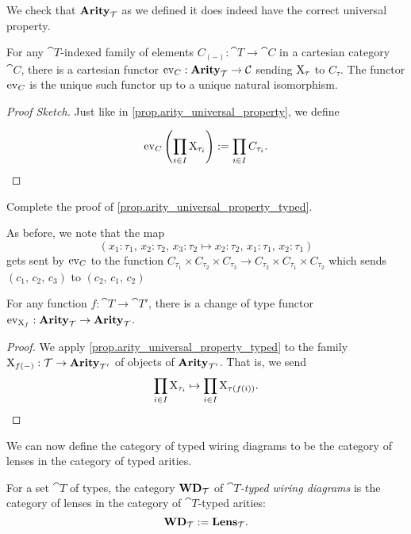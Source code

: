 \documentclass[DynamicalBook]{subfiles}
\begin{document}
We check that $\textbf{Arity}_{\mathcal{T}}$ as we defined it does indeed have the correct
universal property.
\begin{proposition}\label{prop.arity_universal_property_typed}
  For any $\cat{T}$-indexed family of elements $C_{(-)} : \cat{T} \to \cat{C}$
  in a cartesian category $\cat{C}$, there is a cartesian functor $\mathrm{ev}_C :
  \textbf{Arity}_{\mathcal{T}} \to \mathcal{C}$ sending $\mathrm{X}_{\tau}$ to $C_{\tau}$. The functor
  $\mathrm{ev}_C$ is the unique such functor up to a unique natural isomorphism.
\end{proposition}
\begin{proof}[Proof Sketch]
  Just like in \cref{prop.arity_universal_property}, we define

  $$\mathrm{ev}_C\left( \prod_{i \in I} \mathrm{X}_{\tau_i} \right) :=
  \prod_{i \in I} C_{\tau_i}.\qedhere$$
\end{proof}
\begin{exercise}
  Complete the proof of \cref{prop.arity_universal_property_typed}.
\end{exercise}

As before, we note that the map
$$(x_1 : \tau_1,\, x_2 : \tau_2,\, x_3 : \tau_2 \mapsto x_2 : \tau_2,\, x_1 :
\tau_1,\, x_2 : \tau_1)$$
gets sent by $\mathrm{ev}_C$ to the function $C_{\tau_1} \times C_{\tau_2} \times C_{\tau_3} \to
C_{\tau_2} \times C_{\tau_1} \times C_{\tau_2}$ which sends $(c_1,\, c_2,\, c_3)$ to
$(c_2,\, c_1,\, c_2)$

\begin{corollary}\label{cor.arity_change_of_types}
  For any function $f : \cat{T} \to \cat{T'}$, there is a change of type functor
  $\mathrm{ev}_{\mathrm{X}_f} : \textbf{Arity}_{\mathcal{T}} \to \textbf{Arity}_{\mathcal{T}}$.
\end{corollary}
\begin{proof}
  We apply \cref{prop.arity_universal_property_typed} to the family $\mathrm{X}_{f(-)}
  : \mathcal{T} \to \textbf{Arity}_{\mathcal{T'}}$ of objects of $\textbf{Arity}_{\mathcal{T'}}$. That is,
  we send
  $$\prod_{i \in I} \mathrm{X}_{\tau_i} \mapsto \prod_{i \in I} \mathrm{X}_{\tau({f(i))}}.\qedhere$$
\end{proof}

We can now define the category of typed wiring diagrams to be the category of
lenses in the category of typed arities.
\begin{definition}
  For a set $\cat{T}$ of types, the category $\textbf{WD}_{\mathcal{T}}$ of \emph{$\cat{T}$-typed wiring diagrams}
  is the category of lenses in the category of $\cat{T}$-typed arities:
  $$\textbf{WD}_{\mathcal{T}} := \textbf{Lens}_{\mathcal{T}}.$$
\end{definition}
\end{document}
